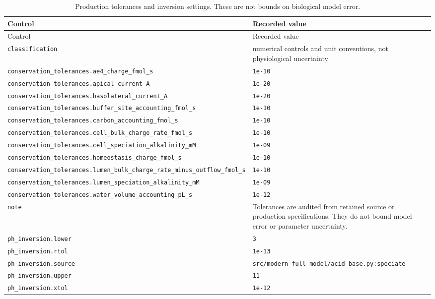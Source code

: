 \begingroup\scriptsize
\setlength{\tabcolsep}{3pt}
\begin{longtable}{p{.49\linewidth}p{.43\linewidth}}
\caption{Production tolerances and inversion settings. These are not bounds on biological model error.}\\
\toprule
Control & Recorded value \\
\midrule\endfirsthead
\toprule
Control & Recorded value \\
\midrule\endhead
\bottomrule\endfoot
\nolinkurl{classification} & numerical controls and unit conventions, not physiological uncertainty \\
\nolinkurl{conservation_tolerances.ae4_charge_fmol_s} & \texttt{1e-10} \\
\nolinkurl{conservation_tolerances.apical_current_A} & \texttt{1e-20} \\
\nolinkurl{conservation_tolerances.basolateral_current_A} & \texttt{1e-20} \\
\nolinkurl{conservation_tolerances.buffer_site_accounting_fmol_s} & \texttt{1e-10} \\
\nolinkurl{conservation_tolerances.carbon_accounting_fmol_s} & \texttt{1e-10} \\
\nolinkurl{conservation_tolerances.cell_bulk_charge_rate_fmol_s} & \texttt{1e-10} \\
\nolinkurl{conservation_tolerances.cell_speciation_alkalinity_mM} & \texttt{1e-09} \\
\nolinkurl{conservation_tolerances.homeostasis_charge_fmol_s} & \texttt{1e-10} \\
\nolinkurl{conservation_tolerances.lumen_bulk_charge_rate_minus_outflow_fmol_s} & \texttt{1e-10} \\
\nolinkurl{conservation_tolerances.lumen_speciation_alkalinity_mM} & \texttt{1e-09} \\
\nolinkurl{conservation_tolerances.water_volume_accounting_pL_s} & \texttt{1e-12} \\
\nolinkurl{note} & Tolerances are audited from retained source or production specifications. They do not bound model error or parameter uncertainty. \\
\nolinkurl{ph_inversion.lower} & \texttt{3} \\
\nolinkurl{ph_inversion.rtol} & \texttt{1e-13} \\
\nolinkurl{ph_inversion.source} & \nolinkurl{src/modern_full_model/acid_base.py:speciate} \\
\nolinkurl{ph_inversion.upper} & \texttt{11} \\
\nolinkurl{ph_inversion.xtol} & \texttt{1e-12} \\

\end{longtable}
